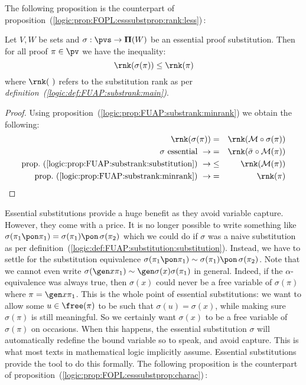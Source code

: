 The following proposition is the counterpart of
proposition~(\ref{logic:prop:FOPL:esssubstprop:rank:less})\,:

\begin{prop}\label{logic:prop:FUAP:esssubstprop:rank:less}
Let $V,W$ be sets and $\sigma:\pvs\to{\bf\Pi}(W)$ be an essential
proof substitution. Then for all proof $\pi\in\pv$ we have the
inequality:
    \[
    \rnk(\sigma(\pi))\leq\rnk(\pi)
    \]
where $\rnk(\,\,)$ refers to the substitution rank as per {\em
definition~(\ref{logic:def:FUAP:substrank:main})}.
\end{prop}
\begin{proof}
Using proposition~(\ref{logic:prop:FUAP:substrank:minrank}) we
obtain the following:
    \begin{eqnarray*}
    \rnk(\sigma(\pi))&=&\rnk({\cal M}\circ\sigma(\pi))\\
    \mbox{$\sigma$ essential}\ \rightarrow
    &=&\rnk(\bar{\sigma}\circ{\cal M}(\pi))\\
    \mbox{prop.~(\ref{logic:prop:FUAP:substrank:substitution})}\ \rightarrow
    &\leq&\rnk({\cal M}(\pi))\\
    \mbox{prop.~(\ref{logic:prop:FUAP:substrank:minrank})}\ \rightarrow
    &=&\rnk(\pi)
    \end{eqnarray*}
\end{proof}

Essential substitutions provide a huge benefit as they avoid
variable capture. However, they come with a price. It is no longer
possible to write something like
$\sigma(\pi_{1}\pon\pi_{1})=\sigma(\pi_{1})\pon\,\sigma(\pi_{2})$
which we could do if $\sigma$ was a naive substitution as per
definition~(\ref{logic:def:FUAP:substitution:substitution}).
Instead, we have to settle for the substitution equivalence
$\sigma(\pi_{1}\pon\pi_{1})\sim\sigma(\pi_{1})\pon\,\sigma(\pi_{2})$.
Note that we cannot even write $\sigma(\gen
x\pi_{1})\sim\gen\sigma(x)\sigma(\pi_{1})$ in general. Indeed, if
the $\alpha$-equivalence was always true, then $\sigma(x)$ could
never be a free variable of $\sigma(\pi)$ where $\pi=\gen x\pi_{1}$.
This is the whole point of essential substitutions: we want to allow
some $u\in\free(\pi)$ to be such that $\sigma(u)=\sigma(x)$, while
making sure $\sigma(\pi)$ is still meaningful. So we certainly want
$\sigma(x)$ to be a free variable of $\sigma(\pi)$ on occasions.
When this happens, the essential substitution $\sigma$ will
automatically redefine the bound variable so to speak, and avoid
capture. This is what most texts in mathematical logic implicitly
assume. Essential substitutions provide the tool to do this
formally. The following proposition is the counterpart of
proposition~(\ref{logic:prop:FOPL:esssubstprop:charac})\,:

